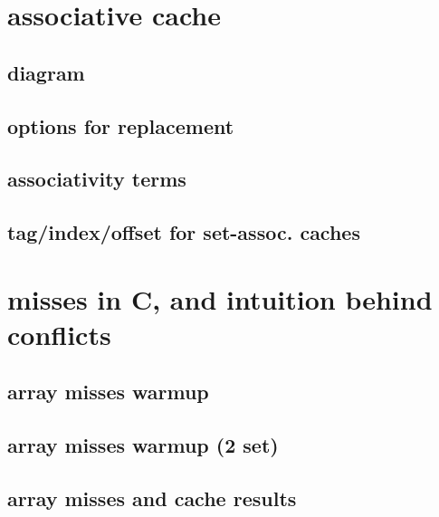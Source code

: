 \section{associative cache}


\subsection{diagram}


\subsection{options for replacement}




\subsection{associativity terms}


\subsection{tag/index/offset for set-assoc. caches}


\section{misses in C, and intuition behind conflicts}


\subsection{array misses warmup}


\subsection{array misses warmup (2 set)}



\subsection{array misses and cache results}


